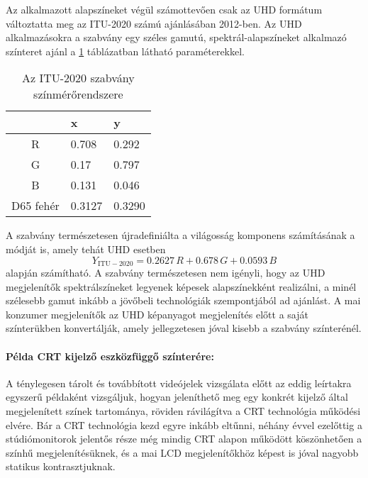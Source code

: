 Az alkalmazott alapszíneket végül számottevően csak az UHD formátum változtatta meg az ITU-2020 számú ajánlásában 2012-ben.
Az UHD alkalmazásokra a szabvány egy széles gamutú, spektrál-alapszíneket alkalmazó színteret ajánl a \ref{tab:UHDTV_colorimetry} táblázatban látható paraméterekkel. 
\begin{table}[h!]
\caption{Az ITU-2020 szabvány színmérőrendszere}
\renewcommand*{\arraystretch}{1}
\label{tab:UHDTV_colorimetry}
\begin{center}
\small\addtolength{\tabcolsep}{15pt}
    \begin{tabular}[h!]{ @{}c | | l | l @{} }%
		&   x  	&    y \\ \hline
    R   &  0.708 &	0.292  \\
    G   &  0.17 &	0.797  \\
    B   & 0.131 &	0.046 \\
    D65 fehér     &  0.3127 & 0.3290 	  \\
    \end{tabular}
\end{center}
\end{table}
A szabvány természetesen újradefiniálta a világosság komponens számításának a módját is, amely tehát UHD esetben
\begin{equation}Y_{\mathrm{ITU}-2020} = 
   0.2627\,R + 0.678 \,G + 0.0593\,B 
\label{Eq:UHD_luminance}
\end{equation}
alapján számítható.
A szabvány természetesen nem igényli, hogy az UHD megjelenítők spektrálszíneket legyenek képesek alapszínekként realizálni, a minél szélesebb gamut inkább a jövőbeli technológiák szempontjából ad ajánlást.
A mai konzumer megjelenítők az UHD képanyagot megjelenítés előtt a saját színterükben konvertálják, amely jellegzetesen jóval kisebb a szabvány színterénél.

\paragraph{Példa CRT kijelző eszközfüggő színterére:\\}

A ténylegesen tárolt és továbbított videójelek vizsgálata előtt az eddig leírtakra egyszerű példaként vizsgáljuk, hogyan jeleníthető meg egy konkrét kijelző által megjelenített színek tartománya, röviden rávilágítva a CRT technológia működési elvére.
Bár a CRT technológia kezd egyre inkább eltűnni, néhány évvel ezelőttig a stúdiómonitorok jelentős része még mindig CRT alapon működött köszönhetően a színhű megjelenítésüknek, és a mai LCD megjelenítőkhöz képest is jóval nagyobb statikus kontrasztjuknak.

